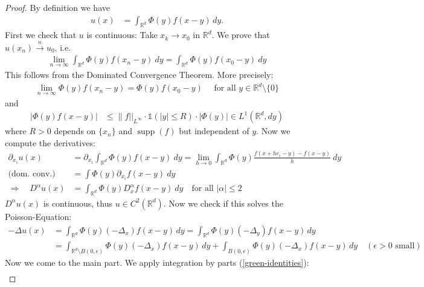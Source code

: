 \documentclass{report}
\theoremstyle{tommy}
\begin{document}
  \begin{proof}
    By definition we have
    \begin{align*}
      u(x) &= \int_{\mathbb{R}^d} \Phi(y) f(x-y) \, dy.
    \end{align*}
    First we check that \(u\) is continuous: Take \(x_k \to x_0\) in \(\mathbb{R}^d\). We prove that \(u(x_n) \xrightarrow{n} u_0\), i.e.
    \begin{align*}
      \lim_{n \to \infty} \int_{\mathbb{R}^d} \Phi(y) f(x_n - y) \ dy = \int_{\mathbb{R}^d} \Phi(y) f(x_0 - y) \ dy
    \end{align*}
    This follows from the Dominated Convergence Theorem. More precisely:
    \begin{align*}
      \lim_{n \to \infty} \Phi(y) f(x_n -y) = \Phi(y) f(x_0 - y) \quad \text{ for all } y \in \mathbb{R}^d \setminus \{0\}
    \end{align*}
    and 
    \begin{align*}
      |\Phi(y) f(x-y)| &\le \| f ||_{L^\infty} \cdot \mathbb{1}(|y| \le R) \cdot |\Phi(y)| \in L^1(\mathbb{R}^d, dy)
    \end{align*}
    where \(R > 0\) depends on \(\{x_n\}\) and \(\operatorname{supp}(f)\) but independent of \(y\). Now we compute the derivatives:
    \begin{align*}
      \partial_{x_i} u(x) 
      &= \partial_{x_i} \int_{\mathbb{R}^d} \Phi(y) f(x-y) \ dy
      = \lim_{h \to 0} \int_{\mathbb{R}^d} \Phi(y) \frac{f(x + h e_i - y) - f(x-y)}{h} \ dy \\
      \text{(dom.\ conv.)} \quad &= \int \Phi(y) \partial_{x_i} f(x-y) \ dy \\
      \Rightarrow \quad D^\alpha u(x) &= \int_{\mathbb{R}^d} \Phi(y) D_x^\alpha f(x-y) \ dy \quad \text{for all } |\alpha| \le 2
    \end{align*}
    \(D^\alpha u(x)\)  is continuous, thus \(u \in C^2(\mathbb{R}^d)\).
    Now we check if this solves the Poisson-Equation:
    \begin{align*}
      - \Delta u(x) 
      &= \int_{\mathbb{R}^d} \Phi(y) (-\Delta_x) f(x-y) \, dy
      = \int_{\mathbb{R}^d} \Phi(y) (-\Delta_y) f(x-y) \, dy \\
      &= \int_{\mathbb{R}^d \setminus B(0, \epsilon)} \Phi(y) (-\Delta_x) f(x-y) \, dy + \int_{B(0, \epsilon)} \Phi(y) (-\Delta_x) f(x-y) \, dy \quad (\epsilon > 0 \text{ small})
    \end{align*}
    Now we come to the main part. We apply integration by parts (\ref{green-identities}):
    \begin{align*}

\end{align*}
\end{proof}
\end{document}
